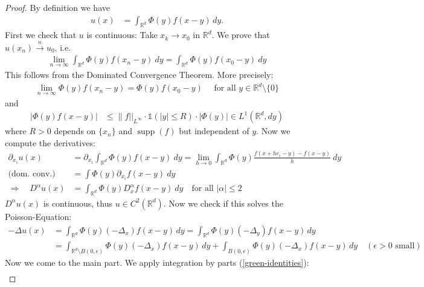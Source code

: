 \documentclass{report}
\theoremstyle{tommy}
\begin{document}
  \begin{proof}
    By definition we have
    \begin{align*}
      u(x) &= \int_{\mathbb{R}^d} \Phi(y) f(x-y) \, dy.
    \end{align*}
    First we check that \(u\) is continuous: Take \(x_k \to x_0\) in \(\mathbb{R}^d\). We prove that \(u(x_n) \xrightarrow{n} u_0\), i.e.
    \begin{align*}
      \lim_{n \to \infty} \int_{\mathbb{R}^d} \Phi(y) f(x_n - y) \ dy = \int_{\mathbb{R}^d} \Phi(y) f(x_0 - y) \ dy
    \end{align*}
    This follows from the Dominated Convergence Theorem. More precisely:
    \begin{align*}
      \lim_{n \to \infty} \Phi(y) f(x_n -y) = \Phi(y) f(x_0 - y) \quad \text{ for all } y \in \mathbb{R}^d \setminus \{0\}
    \end{align*}
    and 
    \begin{align*}
      |\Phi(y) f(x-y)| &\le \| f ||_{L^\infty} \cdot \mathbb{1}(|y| \le R) \cdot |\Phi(y)| \in L^1(\mathbb{R}^d, dy)
    \end{align*}
    where \(R > 0\) depends on \(\{x_n\}\) and \(\operatorname{supp}(f)\) but independent of \(y\). Now we compute the derivatives:
    \begin{align*}
      \partial_{x_i} u(x) 
      &= \partial_{x_i} \int_{\mathbb{R}^d} \Phi(y) f(x-y) \ dy
      = \lim_{h \to 0} \int_{\mathbb{R}^d} \Phi(y) \frac{f(x + h e_i - y) - f(x-y)}{h} \ dy \\
      \text{(dom.\ conv.)} \quad &= \int \Phi(y) \partial_{x_i} f(x-y) \ dy \\
      \Rightarrow \quad D^\alpha u(x) &= \int_{\mathbb{R}^d} \Phi(y) D_x^\alpha f(x-y) \ dy \quad \text{for all } |\alpha| \le 2
    \end{align*}
    \(D^\alpha u(x)\)  is continuous, thus \(u \in C^2(\mathbb{R}^d)\).
    Now we check if this solves the Poisson-Equation:
    \begin{align*}
      - \Delta u(x) 
      &= \int_{\mathbb{R}^d} \Phi(y) (-\Delta_x) f(x-y) \, dy
      = \int_{\mathbb{R}^d} \Phi(y) (-\Delta_y) f(x-y) \, dy \\
      &= \int_{\mathbb{R}^d \setminus B(0, \epsilon)} \Phi(y) (-\Delta_x) f(x-y) \, dy + \int_{B(0, \epsilon)} \Phi(y) (-\Delta_x) f(x-y) \, dy \quad (\epsilon > 0 \text{ small})
    \end{align*}
    Now we come to the main part. We apply integration by parts (\ref{green-identities}):
    \begin{align*}

\end{align*}
\end{proof}
\end{document}
